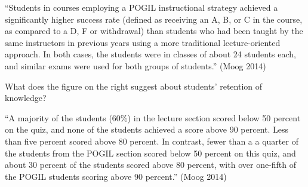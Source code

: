 \begin{answer}[6em]
``Students in courses employing a POGIL instructional strategy achieved a significantly higher success rate (defined as receiving an A, B, or C in the course, as compared to a D, F or withdrawal) than students who had been taught by the same instructors in previous years using a more traditional lecture-oriented approach.
In both cases, the students were in classes of about 24 students each, and similar exams were used for both groups of students.'' (Moog 2014)
\end{answer}


\Q What does the figure on the right suggest about students' retention of knowledge?

\begin{answer}[6em]
``A majority of the students (60\%) in the lecture section scored below 50 percent on the quiz, and none of the students achieved a score above 90 percent.
Less than five percent scored above 80 percent.
In contrast, fewer than a a quarter of the students from the POGIL section scored below 50 percent on this quiz, and about 30 percent of the students scored above 80 percent, with over one-fifth of the POGIL
students scoring above 90 percent.'' (Moog 2014)
\end{answer}
